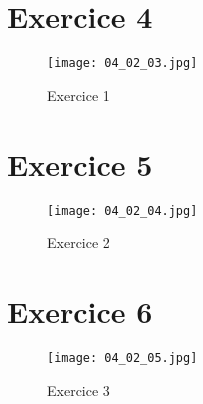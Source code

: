 \documentclass[a4paper,12pt]{article}
\begin{document}
\section{Exercice 4}

\begin{figure}[H]
  \centering
  \texttt{[image: 04\_02\_03.jpg]}
  \caption{\label{} Exercice 1}
\end{figure}

\section{Exercice 5}

\begin{figure}[H]
  \centering
  \texttt{[image: 04\_02\_04.jpg]}
  \caption{\label{} Exercice 2}
\end{figure}

\section{Exercice 6}

\begin{figure}[H]
  \centering
  \texttt{[image: 04\_02\_05.jpg]}
  \caption{\label{} Exercice 3}
\end{figure}
\end{document}
